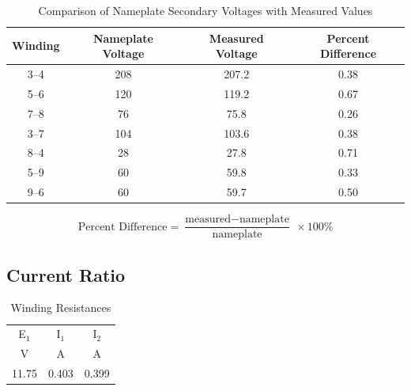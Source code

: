 \documentclass{article}
\begin{document}
\begin{table}[H]
  \centering
  \begin{tabular}{cccc}
    \hline
    Winding & Nameplate Voltage & Measured Voltage & Percent Difference \\
    \hline
    3--4 & 208 & 207.2 & 0.38 \\
    5--6 & 120 & 119.2 & 0.67 \\
    7--8 & 76  & 75.8  & 0.26 \\
    3--7 & 104 & 103.6 & 0.38 \\
    8--4 & 28  & 27.8  & 0.71 \\
    5--9 & 60  & 59.8  & 0.33 \\
    9--6 & 60  & 59.7  & 0.50 \\
  \end{tabular}
  \caption{Comparison of Nameplate Secondary Voltages with Measured Values}
  \label{tab:volt_rat}
\end{table}

\[\text{Percent Difference} = \frac{\text{measured} -
  \text{nameplate}}{\text{nameplate}}\ \times 100\%\]

\subsection{Current Ratio}
\begin{table}[H]
  \centering
  \begin{tabular}{ccc}
    \hline
    E$_1$ & I$_1$ & I$_2$ \\
    V & A & A \\
    \hline
    11.75 & 0.403 & 0.399 \\
  \end{tabular}
  \caption{Winding Resistances}
  \label{tab:curr_rat}
\end{table}
\end{document}
